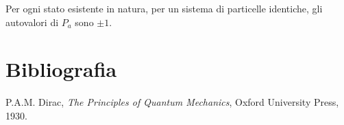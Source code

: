 \documentclass{article}
\begin{document}
Per ogni stato esistente in natura, per un sistema di particelle identiche, gli autovalori di $P_a$ sono $\pm 1$.



\section{Bibliografia}
\begin{thebibliography}{9}
     P.A.M. Dirac, \emph{The Principles of Quantum Mechanics}, Oxford University Press, 1930.
\end{thebibliography}
\end{document}
